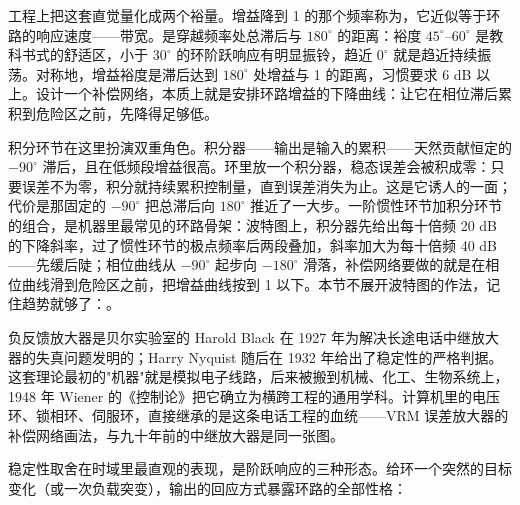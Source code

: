 工程上把这套直觉量化成两个裕量。增益降到 1 的那个频率称为，它近似等于环路的响应速度——带宽。是穿越频率处总滞后与 $180^{\circ}$ 的距离：裕度 $45^{\circ}$--$60^{\circ}$ 是教科书式的舒适区，小于 $30^{\circ}$ 的环阶跃响应有明显振铃，趋近 $0^{\circ}$ 就是趋近持续振荡。对称地，增益裕度是滞后达到 $180^{\circ}$ 处增益与 1 的距离，习惯要求 6 dB 以上。设计一个补偿网络，本质上就是安排环路增益的下降曲线：让它在相位滞后累积到危险区之前，先降得足够低。

积分环节在这里扮演双重角色。积分器——输出是输入的累积——天然贡献恒定的 $-90^{\circ}$ 滞后，且在低频段增益很高。环里放一个积分器，稳态误差会被积成零：只要误差不为零，积分就持续累积控制量，直到误差消失为止。这是它诱人的一面；代价是那固定的 $-90^{\circ}$ 把总滞后向 $180^{\circ}$ 推近了一大步。一阶惯性环节加积分环节的组合，是机器里最常见的环路骨架：波特图上，积分器先给出每十倍频 20 dB 的下降斜率，过了惯性环节的极点频率后两段叠加，斜率加大为每十倍频 40 dB——先缓后陡；相位曲线从 $-90^{\circ}$ 起步向 $-180^{\circ}$ 滑落，补偿网络要做的就是在相位曲线滑到危险区之前，把增益曲线按到 1 以下。本节不展开波特图的作法，记住趋势就够了：。

\begin{classicnote}
负反馈放大器是贝尔实验室的 Harold Black 在 1927 年为解决长途电话中继放大器的失真问题发明的；Harry Nyquist 随后在 1932 年给出了稳定性的严格判据。这套理论最初的"机器"就是模拟电子线路，后来被搬到机械、化工、生物系统上，1948 年 Wiener 的《控制论》把它确立为横跨工程的通用学科。计算机里的电压环、锁相环、伺服环，直接继承的是这条电话工程的血统——VRM 误差放大器的补偿网络画法，与九十年前的中继放大器是同一张图。
\end{classicnote}

稳定性取舍在时域里最直观的表现，是阶跃响应的三种形态。给环一个突然的目标变化（或一次负载突变），输出的回应方式暴露环路的全部性格：

